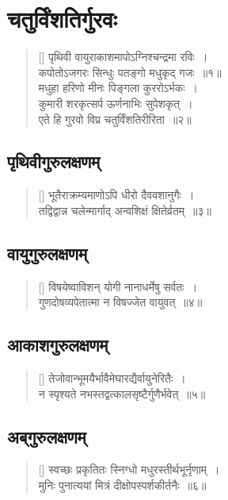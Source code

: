 \documentclass[twoside,12pt,notitlepage]{book}
\begin{document}
\section{चतुर्विंशतिर्गुरवः}
\begin{verse}[\versewidth]
पृथिवी वायुराकाशमापोऽग्निश्चन्द्रमा रविः~।\\[-6pt]
कपोतोऽजगरः सिन्धुः पतङ्गो मधुकृद् गजः~॥१॥\\
मधुहा हरिणो मीनः पिङ्गला कुररोऽर्भकः~।\\[-6pt]
कुमारी शरकृत्सर्प ऊर्णनाभिः सुपेशकृत्~।\\[-6pt]
एते हि गुरवो विप्र चतुर्विंशतिरीरिता~॥२॥
\end{verse}

\subsection*{पृथिवीगुरुलक्षणम्}
\begin{verse}[\versewidth]
भूतैराक्रम्यमाणोऽपि धीरो दैववशानुगैः~।\\[-6pt]
तद्विद्वान्न चलेन्मार्गाद् अन्वशिक्षं क्षितेर्व्रतम्~॥३॥\footA 
\end{verse}

\subsection*{वायुगुरुलक्षणम्}
\begin{verse}[\versewidth]
विषयेष्वाविशन् योगी नानाधर्मेषु सर्वतः~।\\[-6pt]
गुणदोषव्यपेतात्मा न विषज्जेत वायुवत्~॥४॥\footA 
\end{verse}

\subsection*{आकाशगुरुलक्षणम्}
\begin{verse}[\versewidth]
तेजोवान्भूमयैर्भावैमेघारद्यैर्वायुनेरितैः~।\\[-6pt]
न स्पृश्यते नभस्तद्वत्कालसृष्टैर्गुणैर्भवेत्~॥५॥\footA 
\end{verse}


\subsection*{अब्‌गुरुलक्षणम्}
\begin{verse}[\versewidth]
स्वच्छः प्रकृतितः स्निग्धो मधुरस्तीर्थभूर्नृणाम्~।\\[-6pt]
मुनिः पुनात्ययां मित्रं दीक्षोपस्पर्शकीर्तनैः~॥६॥\footA 
\end{verse}
\end{document}
